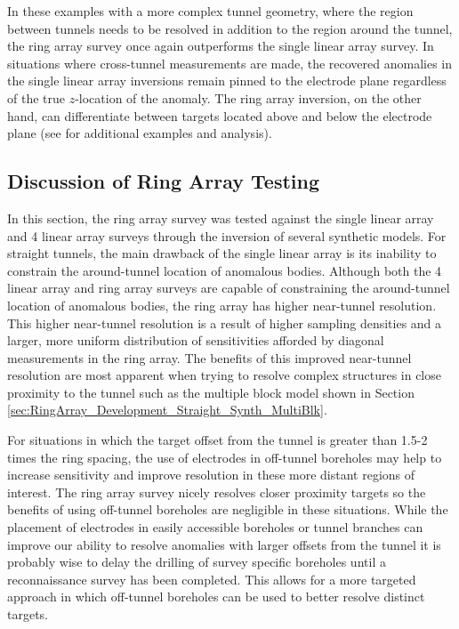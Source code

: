 \documentclass[preprint,authoryear,12pt]{elsarticle}
\begin{document}
In these examples with a more complex tunnel geometry, where the region between tunnels needs to be resolved in addition to the region around the tunnel, the ring array survey once again outperforms the single linear array survey. In situations where cross-tunnel measurements are made, the recovered anomalies in the single linear array inversions remain pinned to the electrode plane regardless of the true $z$-location of the anomaly. The ring array inversion, on the other hand, can differentiate between targets located above and below the electrode plane (see \citet{Mitchell2020} for additional examples and analysis).


\subsection{Discussion of Ring Array Testing}
\label{sec:Discussion_RingArray_Testing}

In this section, the ring array survey was tested against the single linear array and 4 linear array surveys through the inversion of several synthetic models. For straight tunnels, the main drawback of the single linear array is its inability to constrain the around-tunnel location of anomalous bodies. Although both the 4 linear array and ring array surveys are capable of constraining the around-tunnel location of anomalous bodies, the ring array has higher near-tunnel resolution. This higher near-tunnel resolution is a result of higher sampling densities and a larger, more uniform distribution of sensitivities afforded by diagonal measurements in the ring array. The benefits of this improved near-tunnel resolution are most apparent when trying to resolve complex structures in close proximity to the tunnel such as the multiple block model shown in Section \ref{sec:RingArray_Development_Straight_Synth_MultiBlk}.

For situations in which the target offset from the tunnel is greater than 1.5-2 times the ring spacing, the use of electrodes in off-tunnel boreholes may help to increase sensitivity and improve resolution in these more distant regions of interest. The ring array survey nicely resolves closer proximity targets so the benefits of using off-tunnel boreholes are negligible in these situations. While the placement of electrodes in easily accessible boreholes or tunnel branches can improve our ability to resolve anomalies with larger offsets from the tunnel it is probably wise to delay the drilling of survey specific boreholes until a reconnaissance survey has been completed. This allows for a more targeted approach in which off-tunnel boreholes can be used to better resolve distinct targets.
\end{document}
